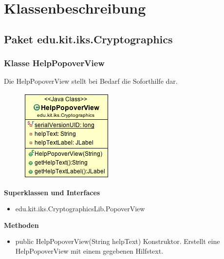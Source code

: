 \documentclass{article}
\begin{document}
\section{Klassenbeschreibung}
  \subsection{Paket edu.kit.iks.Cryptographics}
    \subsubsection{Klasse HelpPopoverView}
      Die HelpPopoverView stellt bei Bedarf die Soforthilfe dar.
      \begin{figure}[H]
        \centering
        \includegraphics[width=\textwidth]{resources/edu-kit-iks-Cryptographics-HelpPopoverView}
      \end{figure}

      \textbf{Superklassen und Interfaces}
      \begin{itemize}
        \item edu.kit.iks.CryptographicsLib.PopoverView
      \end{itemize}
      
      \textbf{Methoden}
      \begin{itemize}
        \item public HelpPopoverView(String helpText) \newline
        Konstruktor. Erstellt eine HelpPopoverView mit einem gegebenen Hilfstext.
      \end{itemize}
\end{document}
